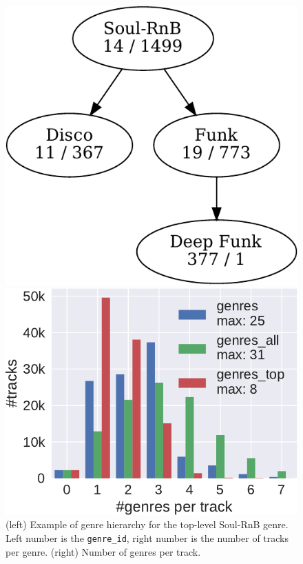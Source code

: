 \documentclass{article}
\begin{document}
\begin{figure}
	\begin{minipage}[t]{0.44\linewidth}
		\centering
		\includegraphics[width=\linewidth]{genre_hierarchy.pdf}
	\end{minipage} \hfill
	\begin{minipage}[t]{0.55\linewidth}
		\centering
		\includegraphics[width=\linewidth]{genres_per_track.pdf}
	\end{minipage}
	\caption{(left) Example of genre hierarchy for the top-level Soul-RnB genre. Left number is the \texttt{genre\_id}, right number is the number of tracks per genre. (right) Number of genres per track.}
	\label{fig:genre_hierarchy}
	\label{fig:genres_per_track}
\end{figure}
\end{document}
